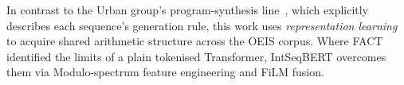 In contrast to the Urban group's program-synthesis line~\cite{urban-alien-coding,gauthier2023qsynt,gauthier2025conjecturing},
which explicitly describes each sequence's generation rule, this work uses \emph{representation
learning} to acquire shared arithmetic structure across the OEIS corpus.
Where FACT~\cite{zurich-fact} identified the limits of a plain tokenised Transformer,
IntSeqBERT overcomes them via Modulo-spectrum feature engineering and FiLM fusion.
